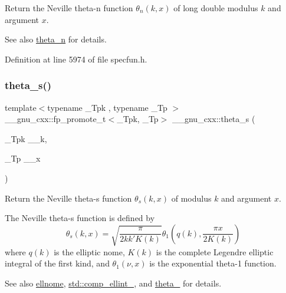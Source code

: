 Return the Neville theta-\/n function $ \theta_n(k,x) $ of {\ttfamily long double} modulus $ k $ and argument $ x $.

\begin{DoxySeeAlso}{See also}
\hyperlink{group__gnu__math__spec__func_ga202778bd650e04e9f3729bfca35c32e2}{theta\+\_\+n} for details. 
\end{DoxySeeAlso}


Definition at line 5974 of file specfun.\+h.

\mbox{\label{group__gnu__math__spec__func_gaf28f2dca107531890b49cccf2bdd67be}} 
\subsubsection{\texorpdfstring{theta\+\_\+s()}{theta\_s()}}
{\footnotesize\ttfamily template$<$typename \+\_\+\+Tpk , typename \+\_\+\+Tp $>$ \\
\+\_\+\+\_\+gnu\+\_\+cxx\+::fp\+\_\+promote\+\_\+t$<$\+\_\+\+Tpk, \+\_\+\+Tp$>$ \+\_\+\+\_\+gnu\+\_\+cxx\+::theta\+\_\+s (\begin{DoxyParamCaption}\item[{\+\_\+\+Tpk}]{\+\_\+\+\_\+k,  }\item[{\+\_\+\+Tp}]{\+\_\+\+\_\+x }\end{DoxyParamCaption})\hspace{0.3cm}{\ttfamily [inline]}}

Return the Neville theta-\/s function $ \theta_s(k,x) $ of modulus $ k $ and argument $ x $.

The Neville theta-\/s function is defined by \[ \theta_s(k,x) = \sqrt{\frac{\pi}{2 k k' K(k)}} \theta_1\left(q(k),\frac{\pi x}{2K(k)}\right) \] where $ q(k) $ is the elliptic nome, $ K(k) $ is the complete Legendre elliptic integral of the first kind, and $ \theta_1(\nu,x) $ is the exponential theta-\/1 function. \begin{DoxySeeAlso}{See also}
\hyperlink{group__gnu__math__spec__func_ga7bfb34f8b5c0ed7c72040f9cb7034bba}{ellnome}, \hyperlink{group__cxx17__math__spec__func_gad559217fb01e7a8b7a6e23eeedda64be}{std\+::comp\+\_\+ellint\+\_}, and \hyperlink{group__gnu__math__spec__func_gaa2e5a3a5f550fe032a596a8b01c878c0}{theta\+\_} for details.
\end{DoxySeeAlso}

